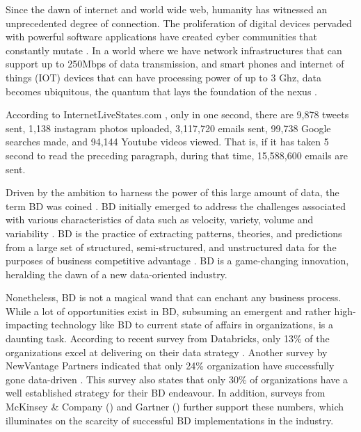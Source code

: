 \documentclass[review]{elsarticle}
\begin{document}
Since the dawn of internet and world wide web, humanity has witnessed an unprecedented degree of connection. The proliferation of digital devices pervaded with powerful software applications have created cyber communities that constantly mutate \cite{AtaeiACIS,AtaeiBigDataEnvirons}. In a world where we have network infrastructures that can support up to 250Mbps of data transmission, and smart phones and internet of things (IOT) devices that can have processing power of up to 3 Ghz, data becomes ubiquitous, the quantum that lays the foundation of the nexus \cite{AtaeiApsec}.

According to InternetLiveStates.com \cite{internet2019internet}, only in one second, there are 9,878 tweets sent, 1,138 instagram photos uploaded, 3,117,720 emails sent, 99,738 Google searches made, and 94,144 Youtube videos viewed. That is, if it has taken 5 second to read the preceding paragraph, during that time, 15,588,600 emails are sent.

Driven by the ambition to harness the power of this large amount of data, the term BD was coined \cite{lycett2013datafication}. BD initially emerged to address the challenges associated with various characteristics of data such as velocity, variety, volume and variability \cite{AtaeiBigDataEnvirons}. BD is the practice of extracting patterns, theories, and predictions from a large set of structured, semi-structured, and unstructured data for the purposes of business competitive advantage \cite{AtaeiHype,Huberty}. BD is a game-changing innovation, heralding the dawn of a new data-oriented industry.
 
Nonetheless, BD is not a magical wand that can enchant any business process. While a lot of opportunities exist in BD, subsuming an emergent and rather high-impacting technology like BD to current state of affairs in organizations, is a daunting task. According to recent survey from Databricks, only 13\% of the organizations excel at delivering on their data strategy \cite{DataBricksSurvey}. Another survey by NewVantage Partners indicated that only 24\% organization have successfully gone data-driven \cite{NewVantageSurvey}. This survey also states that only 30\% of organizations have a well established strategy for their BD endeavour. In addition, surveys from McKinsey \& Company (\cite{analytics2016age}) and Gartner (\cite{Nash}) further support these numbers, which illuminates on the scarcity of successful BD implementations in the industry.
\end{document}
